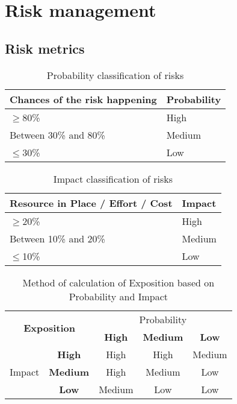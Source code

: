 \section{Risk management}

\subsection{Risk metrics}

\begin{table}[H]
	\centering
	\begin{tabular}{|l|l|}
		\hline
		\rowcolor{gray!30}
		Chances of the risk happening & Probability \\ \hline
		$\geq$80\% & \cellcolor{red!60}High\\ \hline
		Between 30\% and 80\% & \cellcolor{yellow!40}Medium\\ \hline
		$\leq$30\% & \cellcolor{green!60}Low\\ \hline
	\end{tabular}
	\caption{Probability classification of risks}
\end{table}


\begin{table}[H]
	\centering
	\begin{tabular}{|l|l|}
		\hline
		\rowcolor{gray!30}
		Resource in Place / Effort / Cost & Impact \\ \hline
		$\geq$20\% & \cellcolor{red!60}High\\ \hline
		Between 10\% and 20\% & \cellcolor{yellow!40}Medium\\ \hline
		$\leq$10\% & \cellcolor{green!60}Low\\ \hline
	\end{tabular}
	\caption{Impact classification of risks}
\end{table}


\begin{table}[H]
	\centering
	\begin{tabular}{|c|c|c|c|c|}
	\hline
		\multicolumn{2}{|c|}{\multirow{2}{*}{\large\textbf{Exposition}}} & \multicolumn{3}{c|}{Probability}\\
		\multicolumn{2}{|c|}{} & \cellcolor{gray!15}\textbf{High} & \cellcolor{gray!15}\textbf{Medium} & \cellcolor{gray!15}\textbf{Low}\\ \hline %
		\multirow{3}{*}{Impact} & \cellcolor{gray!15}\textbf{High} & \cellcolor{red!60}High & \cellcolor{red!60}High & \cellcolor{yellow!40}Medium\\
		& \cellcolor{gray!15}\textbf{Medium} & \cellcolor{red!60}High & \cellcolor{yellow!40}Medium & \cellcolor{green!60}Low\\
		& \cellcolor{gray!15}\textbf{Low} & \cellcolor{yellow!40}Medium & \cellcolor{green!60}Low & \cellcolor{green!60}Low\\ \hline
	\end{tabular}
	\caption{Method of calculation of Exposition based on Probability and Impact}
\end{table}

